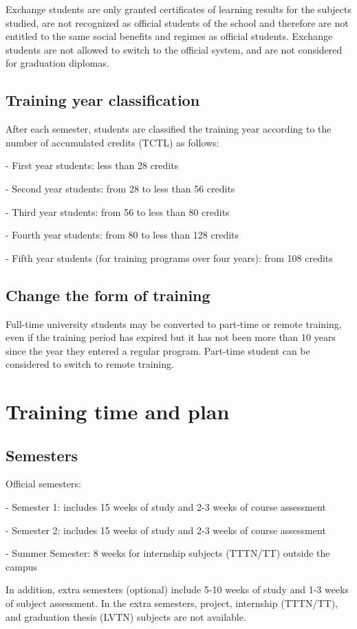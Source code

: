 Exchange students are only granted certificates of learning results for the subjects studied, are not recognized as official students of the school and therefore are not entitled to the same social benefits and regimes as official students. Exchange students are not allowed to switch to the official system, and are not considered for graduation diplomas.

\subsection{Training year classification}
After each semester, students are classified the training year according to the number of accumulated credits (TCTL) as follows:

- First year students: less than 28 credits

- Second year students: from 28 to less than 56 credits

- Third year students: from 56 to less than 80 credits

- Fourth year students: from 80 to less than 128 credits

- Fifth year students (for training programs over four years): from 108 credits

\subsection{Change the form of training}
Full-time university students may be converted to part-time or remote training, even if the training period has expired but it has not been more than 10 years since the year they entered a regular program. Part-time student can be considered to switch to remote training.

\section{Training time and plan}
\subsection{Semesters}
Official semesters:

- Semester 1: includes 15 weeks of study and 2-3 weeks of course assessment

- Semester 2: includes 15 weeks of study and 2-3 weeks of course assessment

- Summer Semester: 8 weeks for internship subjects (TTTN/TT) outside the campus

In addition, extra semesters (optional) include 5-10 weeks of study and 1-3 weeks of subject assessment. In the extra semesters, project, internship (TTTN/TT), and graduation thesis (LVTN) subjects are not available.

